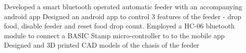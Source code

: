 \resumeItemListStart
\resumeItemDesc
{Developed a smart bluetooth operated automatic feeder with an accompanying android app}
\resumeItemDesc
{Designed an android app to control 3 features of the feeder - drop food, disable feeder and reset food drop count. }
\resumeItemDesc
{Employed a HC-06 bluetooth module to connect a BASIC Stamp micro-controller to to the mobile app}
\resumeItemDesc
{Designed and 3D printed CAD models of the chasis of the feeder}
\resumeItemListEnd



\resumeSubHeadingListEnd
